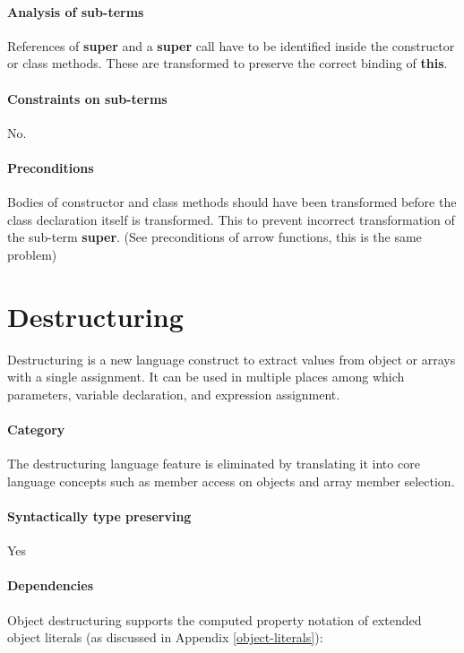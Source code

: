 \paragraph{Analysis of sub-terms}
References of \textbf{super} and a \textbf{super} call have to be identified inside the constructor or class methods. These are transformed to preserve the correct binding of \textbf{this}.

\paragraph{Constraints on sub-terms}
No.

\paragraph{Preconditions}
Bodies of constructor and class methods should have been transformed before the class declaration itself is transformed. This to prevent incorrect transformation of the sub-term \textbf{super}. (See preconditions of arrow functions, this is the same problem)

\section{Destructuring} \label{destructuring}
Destructuring\cite[12.14.5]{SpecJS} is a new language construct to extract values from object or arrays with a single assignment. It can be used in multiple places among which parameters, variable declaration, and expression assignment.

\paragraph{Category}
The destructuring language feature is eliminated by translating it into core language concepts such as member access on objects and array member selection.

\paragraph{Syntactically type preserving}
Yes

\paragraph{Dependencies}
Object destructuring supports the computed property notation of extended object literals (as discussed in Appendix \ref{object-literals}): 

